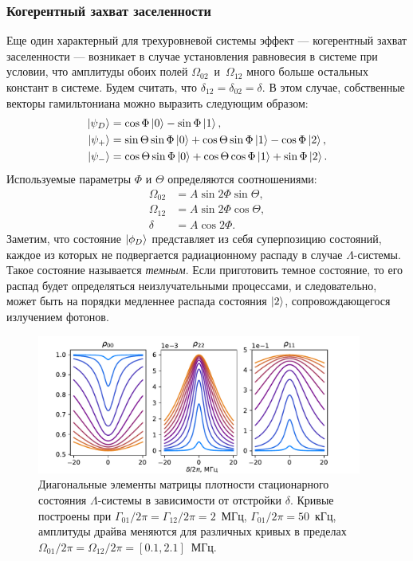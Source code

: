 \subsubsection{Когерентный захват заселенности}
Еще один характерный для трехуровневой системы эффект --- когерентный захват заселенности \cite{vanier1998coherent} --- возникает в случае установления равновесия в системе при условии, что амплитуды обоих полей $\Omega_{02}$~и~$\Omega_{12}$ много больше остальных констант в системе. Будем считать, что $\delta_{12}=\delta_{02}=\delta$. В этом случае, собственные векторы гамильтониана можно выразить следующим образом:
\begin{equation}
\begin{aligned}
\ket{\psi_D} &= \cos\Phi\ket{0} - \sin\Phi\ket{1}, \\
\ket{\psi_+} &= \sin\Theta\sin\Phi \ket{0} + \cos\Theta \sin \Phi\ket{1} -\cos\Phi \ket{2}, \\
\ket{\psi_-} &= \cos\Theta\sin\Phi\ket{0} + \cos\Theta\cos\Phi\ket{1} + \sin\Phi\ket{2}.
\end{aligned}
\end{equation}
Используемые параметры $\Phi$ и $\Theta$ определяются соотношениями:
\begin{equation}
\begin{aligned}
\Omega_{02} &= A\sin 2\Phi\sin\Theta, \\
\Omega_{12} &= A\sin 2\Phi \cos\Theta, \\
\delta &= A\cos 2\Phi. 
\end{aligned}
\end{equation}
Заметим, что состояние $\ket{\phi_D}$ представляет из себя суперпозицию состояний, каждое из которых не подвергается радиационному распаду в случае $\Lambda$-системы. Такое состояние называется \textit{темным}. Если приготовить темное состояние, то его распад будет определяться неизлучательными процессами, и следовательно, может быть на порядки медленнее распада состояния $\ket{2}$, сопровождающегося излучением фотонов.
\begin{figure}[h]
	\centering
	\includegraphics[width=0.95\textwidth]{images/CPT_plot_small.pdf}	 
	\caption[Когерентный захват заселенности в $\Lambda$-системе]{Диагональные элементы матрицы плотности стационарного состояния $\Lambda$-системы в зависимости от отстройки $\delta$. Кривые построены при $\Gamma_{01}/2\pi=\Gamma_{12}/2\pi = 2$~МГц, $\Gamma_{01}/2\pi=50$~кГц, амплитуды драйва меняются для различных кривых в пределах $\Omega_{01}/2\pi=\Omega_{12}/2\pi = [0.1, 2.1]$~МГц.}
	\label{img: CPT_plot}
\end{figure}
